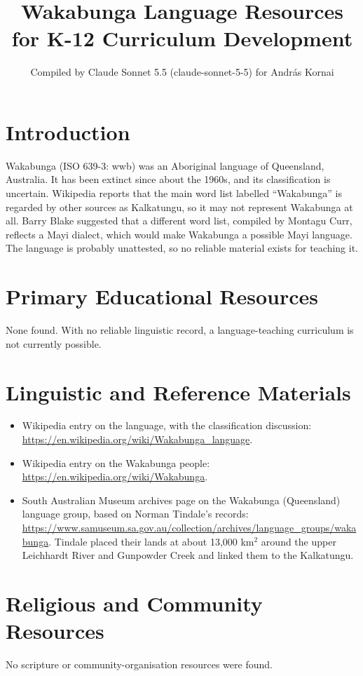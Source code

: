 \documentclass[12pt]{article}
\title{Wakabunga Language Resources for K-12 Curriculum Development}
\author{Compiled by Claude Sonnet 5.5 (claude-sonnet-5-5) for Andr\'as Kornai}
\date{}
\begin{document}
\maketitle

\section{Introduction}
Wakabunga (ISO 639-3: wwb) was an Aboriginal language of Queensland, Australia. It has been extinct since about the 1960s, and its classification is uncertain. Wikipedia reports that the main word list labelled ``Wakabunga'' is regarded by other sources as Kalkatungu, so it may not represent Wakabunga at all. Barry Blake suggested that a different word list, compiled by Montagu Curr, reflects a Mayi dialect, which would make Wakabunga a possible Mayi language. The language is probably unattested, so no reliable material exists for teaching it.

\section{Primary Educational Resources}
None found. With no reliable linguistic record, a language-teaching curriculum is not currently possible.

\section{Linguistic and Reference Materials}
\begin{itemize}
\item Wikipedia entry on the language, with the classification discussion: \url{https://en.wikipedia.org/wiki/Wakabunga_language}.
\item Wikipedia entry on the Wakabunga people: \url{https://en.wikipedia.org/wiki/Wakabunga}.
\item South Australian Museum archives page on the Wakabunga (Queensland) language group, based on Norman Tindale's records: \url{https://www.samuseum.sa.gov.au/collection/archives/language_groups/wakabunga}. Tindale placed their lands at about 13,000 km$^2$ around the upper Leichhardt River and Gunpowder Creek and linked them to the Kalkatungu.
\end{itemize}

\section{Religious and Community Resources}
No scripture or community-organisation resources were found.
\end{document}
